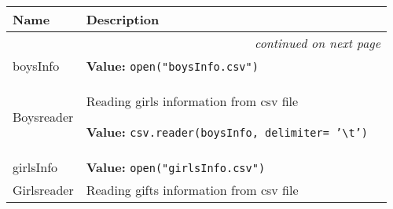     \vspace{-1cm}
\hspace{\varindent}\begin{longtable}{|p{\varnamewidth}|p{\vardescrwidth}|l}
\cline{1-2}
\cline{1-2} \centering \textbf{Name} & \centering \textbf{Description}& \\
\cline{1-2}
\endhead\cline{1-2}\multicolumn{3}{r}{\small\textit{continued on next page}}\\\endfoot\cline{1-2}
\endlastfoot\raggedright b\-o\-y\-s\-I\-n\-f\-o\- & \raggedright \textbf{Value:} 
{\tt open("boysInfo.csv")}&\\
\cline{1-2}
\raggedright B\-o\-y\-s\-r\-e\-a\-d\-e\-r\- & \raggedright Reading girls information from csv file

\textbf{Value:} 
{\tt csv.reader(boysInfo, delimiter= '{\textbackslash}t')}&\\
\cline{1-2}
\raggedright g\-i\-r\-l\-s\-I\-n\-f\-o\- & \raggedright \textbf{Value:} 
{\tt open("girlsInfo.csv")}&\\
\cline{1-2}
\raggedright G\-i\-r\-l\-s\-r\-e\-a\-d\-e\-r\- & \raggedright Reading gifts information from csv file


\end{longtable}
